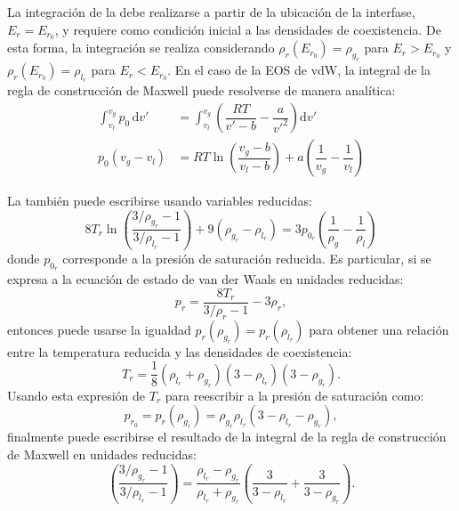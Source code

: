 La integraci\'on de la  debe realizarse a partir de la ubicaci\'on de la interfase, $E_r = E_{r_0}$, y requiere como condici\'on inicial a las densidades de coexistencia. De esta forma, la integraci\'on se realiza considerando $\rho_r(E_{r_0}) = \rho_{g_r}$ para $E_r > E_{r_0}$ y $\rho_r(E_{r_0}) = \rho_{l_r}$ para $E_r < E_{r_0}$. En el caso de la EOS de vdW, la integral de la regla de construcci\'on de Maxwell puede resolverse de manera anal\'itica:
\begin{equation}
	\begin{aligned}
	\int_{v_l}^{v_g} p_0 \, \mbox{d}v' &= \int_{v_l}^{v_g} \left( \dfrac{RT}{v'-b} - \dfrac{a}{v'^2} \right) \mbox{d}v' \\
		p_0(v_g-v_l) &= RT \ln \left( \dfrac{v_g - b}{v_l-b} \right) + a\left( \dfrac{1}{v_g} - \dfrac{1}{v_l} \right)
	\end{aligned}
	\label{eq:vdw_maxwell_analitica}
\end{equation}


La  tambi\'en puede escribirse usando variables reducidas:
\begin{equation}
	8T_r \ln \left( \dfrac{3/\rho_{g_r}-1}{3/\rho_{l_r}-1} \right) + 9(\rho_{g_r} - \rho_{l_r}) = 3p_{0_r} \left( \dfrac{1}{\rho_g} - \dfrac{1}{\rho_l} \right)
\end{equation}
donde $p_{0_r}$ corresponde a la presi\'on de saturaci\'on reducida. Es particular, si se expresa a la ecuaci\'on de estado de van der Waals en unidades reducidas:
\begin{equation}
 p_r = \dfrac{8 T_r}{3/\rho_r-1} - 3\rho_r,
\end{equation}
entonces puede usarse la igualdad $p_r(\rho_{g_r}) = p_r(\rho_{l_r})$ para obtener una relaci\'on entre la temperatura reducida y las densidades de coexistencia:
\begin{equation}
	T_r = \dfrac{1}{8}(\rho_{l_r}+\rho_{g_r})(3-\rho_{l_r})(3-\rho_{g_r}).
	\label{eq:tr_maxwell}
\end{equation}
Usando esta expresi\'on de $T_r$ para reescribir a la presi\'on de saturaci\'on como:
\begin{equation}
	p_{r_0} = p_r(\rho_{g_r}) = \rho_{g_r} \rho_{l_r} ( 3 - \rho_{l_r} - \rho_{g_r} ),
\end{equation}
finalmente puede escribirse el resultado de la integral de la regla de construcci\'on de Maxwell en unidades reducidas:
\begin{equation}
	\left( \dfrac{3/\rho_{g_r}-1}{3/\rho_{l_r}-1} \right) = \dfrac{\rho_{l_r} - \rho_{g_r}}{\rho_{l_r} + \rho_{g_r}}\left( \dfrac{3}{3-\rho_{l_r}} + \dfrac{3}{3-\rho_{g_r}} \right).
	\label{eq:rhor_maxwell}
\end{equation}

